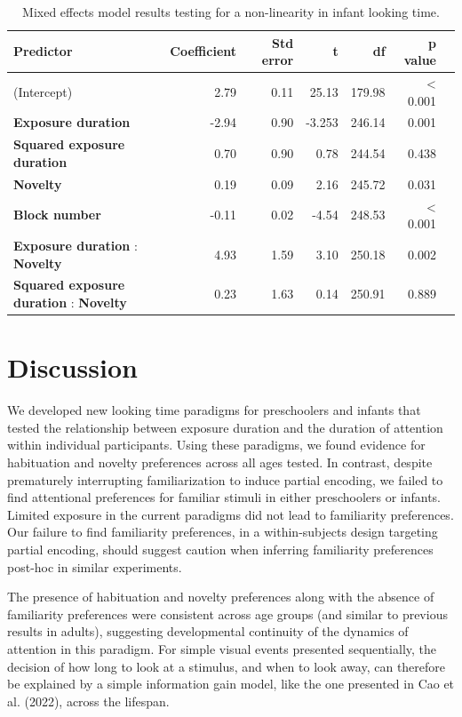 \documentclass[10pt, letterpaper]{article}
\begin{document}
\begin{table}[t]
\centering
\begin{tabular}{lrrrrrr}
  \hline
 Predictor & Coefficient & Std error & t & df & p value \\ 
  \hline
(Intercept) & 2.79 & 0.11 & 25.13 & 179.98 & \textless{ 0.001} \\ 
  \textbf{Exposure duration} & -2.94 & 0.90 & -3.253 & 246.14 & 0.001 \\ 
  \textbf{Squared exposure duration} & 0.70 & 0.90 & 0.78 & 244.54 & 0.438 \\ 
  \textbf{Novelty} & 0.19 & 0.09 & 2.16 & 245.72 & 0.031 \\ 
  \textbf{Block number} & -0.11 & 0.02 & -4.54 & 248.53 & \textless{ 0.001} \\ 
  \textbf{Exposure duration} : \textbf{Novelty} & 4.93 & 1.59 & 3.10 & 250.18 & 0.002 \\ 
  \textbf{Squared exposure duration} : \textbf{Novelty} & 0.23 & 1.63 & 0.14 & 250.91 & 0.889 \\ 
   \hline
\end{tabular}
\caption{Mixed effects model results testing for a non-linearity in infant looking time.}\label{wrap-tab:1}
\end{table}

\hypertarget{discussion}{%
\section{Discussion}\label{discussion}}

We developed new looking time paradigms for preschoolers and infants
that tested the relationship between exposure duration and the duration
of attention within individual participants. Using these paradigms, we
found evidence for habituation and novelty preferences across all ages
tested. In contrast, despite prematurely interrupting familiarization to
induce partial encoding, we failed to find attentional preferences for
familiar stimuli in either preschoolers or infants. Limited exposure in
the current paradigms did not lead to familiarity preferences. Our
failure to find familiarity preferences, in a within-subjects design
targeting partial encoding, should suggest caution when inferring
familiarity preferences post-hoc in similar experiments.

The presence of habituation and novelty preferences along with the
absence of familiarity preferences were consistent across age groups
(and similar to previous results in adults), suggesting developmental
continuity of the dynamics of attention in this paradigm. For simple
visual events presented sequentially, the decision of how long to look
at a stimulus, and when to look away, can therefore be explained by a
simple information gain model, like the one presented in Cao et al.
(2022), across the lifespan.
\end{document}
